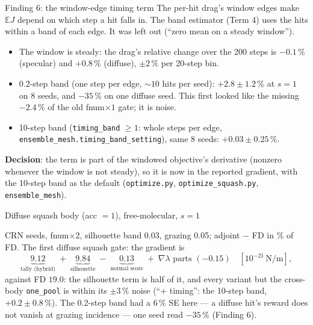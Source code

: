 \documentclass[10pt,aspectratio=169]{beamer}
\newcommand{\E}{\mathbb{E}}
\newcommand{\code}[1]{\texttt{\small #1}}
\begin{document}
\begin{frame}{Finding 6: the window-edge timing term}
The per-hit drag's window edges make $\E J$ depend on which step a hit falls in.  The band
estimator (Term 4) uses the hits within a band of each edge.  It was left out (``zero mean
on a steady window'').
\begin{itemize}
\item The window is steady: the drag's relative change over the 200 steps is $-0.1\,\%$
  (specular) and $+0.8\,\%$ (diffuse), $\pm2\,\%$ per 20-step bin.
\item 0.2-step band (one step per edge, $\sim10$ hits per seed): $+2.8\pm1.2\,\%$ at $s = 1$
  on 8 seeds, and $-35\,\%$ on one diffuse seed.  This first looked like the missing
  $-2.4\,\%$ of the old fnum$\times1$ gate; it is noise.
\item 10-step band (\code{timing\_band} $\ge 1$: whole steps per edge,
  \code{ensemble\_mesh.timing\_band\_setting}), same 8 seeds: $+0.03\pm0.25\,\%$.
\end{itemize}
\textbf{Decision}: the term is part of the windowed objective's derivative (nonzero whenever
the window is not steady), so it is now in the reported gradient, with the 10-step band as
the default (\code{optimize.py}, \code{optimize\_squash.py}, \code{ensemble\_mesh}).
\end{frame}

\begin{frame}{Diffuse squash body (acc $=1$), free-molecular, $s = 1$}
\footnotesize


\normalsize
{} CRN seeds, fnum$\times2$, silhouette band 0.03, grazing 0.05; adjoint $-$ FD in \% of FD.
The first diffuse squash gate: the gradient is
\[
\underbrace{9.12}_{\text{tally (hybrid)}} \;+\; \underbrace{9.84}_{\text{silhouette}} \;-\;
\underbrace{0.13}_{\text{normal score}} \;+\; \nabla\lambda\text{ parts }(-0.15)
\quad[10^{-21}\,\mathrm{N/m}] ,
\]
against FD $19.0$: the silhouette term is half of it, and every variant but the cross-body
\code{one\_pool} is within its $\pm3\,\%$ noise (``+ timing'': the 10-step band, $+0.2\pm0.8\,\%$).
The 0.2-step band had a $6\,\%$ SE here --- a diffuse hit's reward does not vanish at grazing
incidence --- one seed read $-35\,\%$ (Finding 6).
\end{frame}
\end{document}
